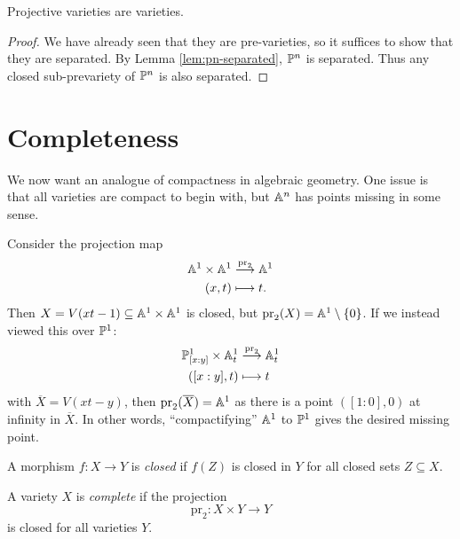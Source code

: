 \begin{prop}
  Projective varieties are varieties.
\end{prop}

\begin{proof}
  We have already seen that they are
  pre-varieties, so
  it suffices to show that they are separated.
  By Lemma \ref{lem:pn-separated},
  $\mathbb{P}^n$ is separated. Thus
  any closed sub-prevariety of $\mathbb{P}^n$ is also
  separated.
\end{proof}

\section{Completeness}

\begin{remark}
  We now want an analogue of compactness
  in algebraic geometry. One issue
  is that all varieties are
  compact to begin with, but
  $\mathbb{A}^n$ has points missing in some
  sense.
\end{remark}

\begin{example}\label{ex:missing-point}
  Consider the projection map
  \begin{align*}
    \mathbb{A}^1 \times \mathbb{A}^1
    &\overset{\mathrm{pr}_2}{\longrightarrow} \mathbb{A}^1 \\
    (x, t) &\longmapsto t.
  \end{align*}
  Then $X = V(xt - 1) \subseteq \mathbb{A}^1 \times \mathbb{A}^1$
  is closed, but
  $\mathrm{pr}_2(X) = \mathbb{A}^1 \setminus \{0\}$.
  If we instead viewed this over $\mathbb{P}^1$:
  \begin{align*}
    \mathbb{P}^1_{[x : y]} \times \mathbb{A}^1_t
    &\overset{\mathrm{pr}_2}{\longrightarrow} \mathbb{A}^1_t \\
    ([x : y], t) &\longmapsto t
  \end{align*}
  with $\overline{X} = V(xt - y)$,
  then $\mathrm{pr}_2(\overline{X}) = \mathbb{A}^1$
  as there is a point
  $([1 : 0], 0)$ at infinity in
  $\overline{X}$.
  In other words, ``compactifying''
  $\mathbb{A}^1$ to $\mathbb{P}^1$ gives the
  desired missing point.
\end{example}

\begin{definition}
  A morphism $f : X \to Y$ is
  \emph{closed} if $f(Z)$ is
  closed in $Y$ for all closed sets $Z \subseteq X$.
\end{definition}

\begin{definition}
  A variety $X$ is \emph{complete}
  if the projection
  \[
    \mathrm{pr}_2
    : X \times Y \longrightarrow Y
  \]
  is closed for all varieties $Y$.
\end{definition}

